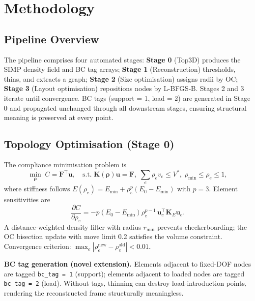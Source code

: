 \documentclass[11pt,a4paper]{article}
\begin{document}
\section{Methodology}
\label{sec:methodology}

\subsection{Pipeline Overview}
\label{subsec:overview}

The pipeline comprises four automated stages:
\textbf{Stage 0} (Top3D) produces the SIMP density field and BC tag arrays;
\textbf{Stage 1} (Reconstruction) thresholds, thins, and extracts a graph;
\textbf{Stage 2} (Size optimisation) assigns radii by OC;
\textbf{Stage 3} (Layout optimisation) repositions nodes by L-BFGS-B.
Stages 2 and 3 iterate until convergence.
BC tags (support = 1, load = 2) are generated in Stage 0 and propagated
unchanged through all downstream stages, ensuring structural meaning is
preserved at every point.

\subsection{Topology Optimisation (Stage 0)}
\label{subsec:top3d}

The compliance minimisation problem is
\begin{equation}
    \min_{\boldsymbol{\rho}} \; C = \mathbf{F}^{\top}\mathbf{u}, \quad
    \text{s.t.} \; \mathbf{K}(\boldsymbol{\rho})\mathbf{u} = \mathbf{F},\;
    \sum_e \rho_e v_e \leq V^*,\; \rho_{\min} \leq \rho_e \leq 1,
    \label{eq:simp_opt}
\end{equation}
where stiffness follows $E(\rho_e) = E_{\min} + \rho_e^p(E_0 - E_{\min})$
with $p = 3$.
Element sensitivities are
\begin{equation}
    \frac{\partial C}{\partial \rho_e}
      = -p(E_0 - E_{\min})\rho_e^{p-1}\,\mathbf{u}_e^{\top}\mathbf{K}_E\mathbf{u}_e.
    \label{eq:simp_sens}
\end{equation}
A distance-weighted density filter with radius $r_{\min}$ prevents
checkerboarding; the OC bisection update with move limit 0.2 satisfies the
volume constraint.
Convergence criterion: $\max_e |\rho_e^{\text{new}} - \rho_e^{\text{old}}| < 0.01$.

\textbf{BC tag generation (novel extension).}
Elements adjacent to fixed-DOF nodes are tagged \texttt{bc\_tag = 1} (support);
elements adjacent to loaded nodes are tagged \texttt{bc\_tag = 2} (load).
Without tags, thinning can destroy load-introduction points, rendering the
reconstructed frame structurally meaningless.
\end{document}
